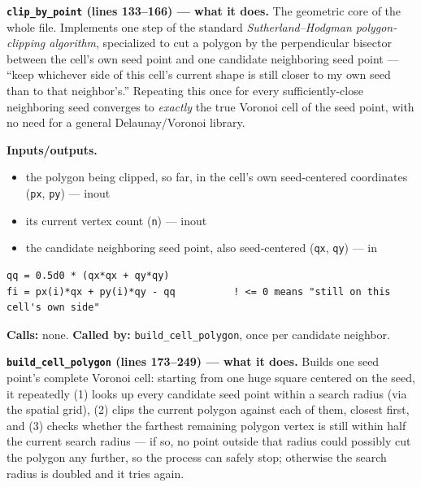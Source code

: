 \documentclass[11pt]{article}
\begin{document}
\textbf{\texttt{clip\_by\_point} (lines 133--166) --- what it does.} The geometric core
of the whole file. Implements one step of the standard \emph{Sutherland--Hodgman
polygon-clipping algorithm}, specialized to cut a polygon by the perpendicular bisector
between the cell's own seed point and one candidate neighboring seed point --- ``keep
whichever side of this cell's current shape is still closer to my own seed than to that
neighbor's.'' Repeating this once for every sufficiently-close neighboring seed
converges to \emph{exactly} the true Voronoi cell of the seed point, with no need for a
general Delaunay/Voronoi library.

\textbf{Inputs/outputs.}
\begin{itemize}[nosep]
  \item the polygon being clipped, so far, in the cell's own seed-centered coordinates (\texttt{px}, \texttt{py}) --- inout
  \item its current vertex count (\texttt{n}) --- inout
  \item the candidate neighboring seed point, also seed-centered (\texttt{qx}, \texttt{qy}) --- in
\end{itemize}

\begin{lstlisting}[caption={The half-plane test at the heart of \texttt{clip\_by\_point}: keep a vertex only if it is closer to this cell's own seed than to the candidate neighbor.}]
qq = 0.5d0 * (qx*qx + qy*qy)
fi = px(i)*qx + py(i)*qy - qq          ! <= 0 means "still on this cell's own side"
\end{lstlisting}

\textbf{Calls:} none. \textbf{Called by:} \texttt{build\_cell\_polygon}, once per
candidate neighbor.

\textbf{\texttt{build\_cell\_polygon} (lines 173--249) --- what it does.} Builds one
seed point's complete Voronoi cell: starting from one huge square centered on the seed,
it repeatedly (1) looks up every candidate seed point within a search radius (via the
spatial grid), (2) clips the current polygon against each of them, closest first, and
(3) checks whether the farthest remaining polygon vertex is still within half the
current search radius --- if so, no point outside that radius could possibly cut the
polygon any further, so the process can safely stop; otherwise the search radius is
doubled and it tries again.
\end{document}
